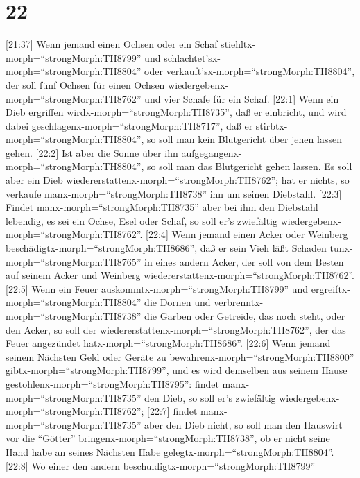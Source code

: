 \hypertarget{section-21}{%
\section{22}\label{section-21}}

 {[}21:37{]} Wenn jemand einen Ochsen oder ein Schaf
stiehltx-morph=``strongMorph:TH8799'' und
schlachtet'sx-morph=``strongMorph:TH8804'' oder
verkauft'sx-morph=``strongMorph:TH8804'', der soll fünf Ochsen für einen
Ochsen wiedergebenx-morph=``strongMorph:TH8762'' und vier Schafe für ein
Schaf.  {[}22:1{]} Wenn ein Dieb ergriffen
wirdx-morph=``strongMorph:TH8735'', daß er einbricht, und wird dabei
geschlagenx-morph=``strongMorph:TH8717'', daß er
stirbtx-morph=``strongMorph:TH8804'', so soll man kein Blutgericht über
jenen lassen gehen.  {[}22:2{]} Ist aber die Sonne über ihn
aufgegangenx-morph=``strongMorph:TH8804'', so soll man das Blutgericht
gehen lassen. Es soll aber ein Dieb
wiedererstattenx-morph=``strongMorph:TH8762''; hat er nichts, so
verkaufe manx-morph=``strongMorph:TH8738'' ihn um seinen Diebstahl.
 {[}22:3{]} Findet manx-morph=``strongMorph:TH8735'' aber
bei ihm den Diebstahl lebendig, es sei ein Ochse, Esel oder Schaf, so
soll er's zwiefältig wiedergebenx-morph=``strongMorph:TH8762''.
 {[}22:4{]} Wenn jemand einen Acker oder Weinberg
beschädigtx-morph=``strongMorph:TH8686'', daß er sein Vieh läßt Schaden
tunx-morph=``strongMorph:TH8765'' in eines andern Acker, der soll von
dem Besten auf seinem Acker und Weinberg
wiedererstattenx-morph=``strongMorph:TH8762''.  {[}22:5{]}
Wenn ein Feuer auskommtx-morph=``strongMorph:TH8799'' und
ergreiftx-morph=``strongMorph:TH8804'' die Dornen und
verbrenntx-morph=``strongMorph:TH8738'' die Garben oder Getreide, das
noch steht, oder den Acker, so soll der
wiedererstattenx-morph=``strongMorph:TH8762'', der das Feuer angezündet
hatx-morph=``strongMorph:TH8686''.  {[}22:6{]} Wenn jemand
seinem Nächsten Geld oder Geräte zu
bewahrenx-morph=``strongMorph:TH8800''
gibtx-morph=``strongMorph:TH8799'', und es wird demselben aus seinem
Hause gestohlenx-morph=``strongMorph:TH8795'': findet
manx-morph=``strongMorph:TH8735'' den Dieb, so soll er's zwiefältig
wiedergebenx-morph=``strongMorph:TH8762'';  {[}22:7{]}
findet manx-morph=``strongMorph:TH8735'' aber den Dieb nicht, so soll
man den Hauswirt vor die ``Götter''
bringenx-morph=``strongMorph:TH8738'', ob er nicht seine Hand habe an
seines Nächsten Habe gelegtx-morph=``strongMorph:TH8804''. 
{[}22:8{]} Wo einer den andern beschuldigtx-morph=``strongMorph:TH8799''
